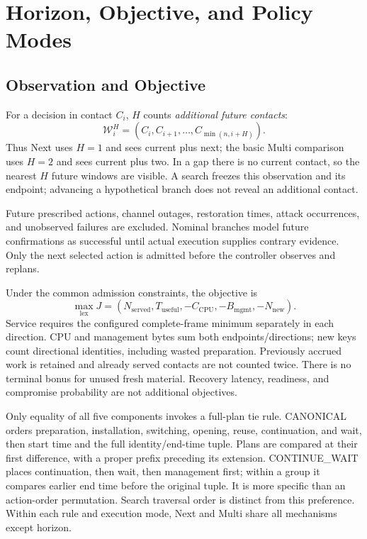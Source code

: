 \documentclass[conference]{IEEEtran}
\begin{document}
\section{Horizon, Objective, and Policy Modes}
\subsection{Observation and Objective}
For a decision in contact $C_i$, $H$ counts \emph{additional future contacts}:
\begin{equation}
\mathcal W_i^H=(C_i,C_{i+1},\ldots,C_{\min(n,i+H)}).
\end{equation}
Thus Next uses $H=1$ and sees current plus next; the basic Multi comparison uses $H=2$ and sees current plus two. In a gap there is no current contact, so the nearest $H$ future windows are visible. A search freezes this observation and its endpoint; advancing a hypothetical branch does not reveal an additional contact.

Future prescribed actions, channel outages, restoration times, attack occurrences, and unobserved failures are excluded. Nominal branches model future confirmations as successful until actual execution supplies contrary evidence. Only the next selected action is admitted before the controller observes and replans.

Under the common admission constraints, the objective is
\begin{equation}
\max_{\mathrm{lex}} J=(N_{\mathrm{served}},T_{\mathrm{useful}},-C_{\mathrm{CPU}},-B_{\mathrm{mgmt}},-N_{\mathrm{new}}).
\label{eq:objective}
\end{equation}
Service requires the configured complete-frame minimum separately in each direction. CPU and management bytes sum both endpoints/directions; new keys count directional identities, including wasted preparation. Previously accrued work is retained and already served contacts are not counted twice. There is no terminal bonus for unused fresh material. Recovery latency, readiness, and compromise probability are not additional objectives.

Only equality of all five components invokes a full-plan tie rule. CANONICAL orders preparation, installation, switching, opening, reuse, continuation, and wait, then start time and the full identity/end-time tuple. Plans are compared at their first difference, with a proper prefix preceding its extension. CONTINUE\_WAIT places continuation, then wait, then management first; within a group it compares earlier end time before the original tuple. It is more specific than an action-order permutation. Search traversal order is distinct from this preference. Within each rule and execution mode, Next and Multi share all mechanisms except horizon.
\end{document}
